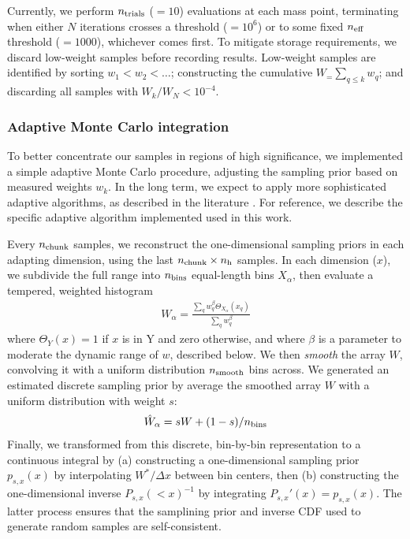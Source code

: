 Currently, we perform $n_{\rm trials}$ ($=10$) evaluations at each mass point, terminating when either $N$ iterations
crosses a threshold ($=10^6$) or to some fixed
$n_{\rm eff}$ threshold ($=1000$), whichever comes first.  
To mitigate storage requirements, we discard  low-weight samples before recording results.  Low-weight samples are identified by sorting  $w_1<w_2<\ldots$;
constructing the cumulative $W_=\sum_{q\le k} w_q$; and discarding all samples with $W_k/W_N<10^{-4}$.  

\subsubsection{Adaptive Monte Carlo integration}

To better concentrate our samples in regions of high significance, we implemented a simple adaptive Monte Carlo procedure, adjusting
the sampling prior based on measured weights $w_k$.   In the long term, we expect to apply more sophisticated adaptive
algorithms, as described in the literature \cite{book-mm-NumericalRecipies,peter1978new}.  For reference, we describe
the specific adaptive algorithm implemented used in this work.


Every $n_{\rm chunk}$ samples, we reconstruct the one-dimensional sampling priors in each adapting dimension, using
the last $n_{\rm chunk}\times n_{\rm h}$ samples.    In each dimension ($x$), we subdivide the full range
into $n_{\rm bins}$ equal-length bins $X_\alpha$, then evaluate a tempered, weighted histogram
\begin{eqnarray}
W_\alpha = \frac{\sum_{q} w_q^\beta \Theta_{X_\alpha}(x_q)}{\sum_q w_q^\beta}
\end{eqnarray}
where $\Theta_Y(x)=1$ if  $x$ is in Y and zero otherwise,  and where $\beta$ is a  parameter to moderate the dynamic
range of $w$, described below.  
%
We then \emph{smooth} the array $W$, convolving it with a uniform distribution $n_{\rm smooth}$ bins across.
%
We generated an estimated discrete sampling prior by average the smoothed array $W$ with a uniform distribution with weight $s$:
\begin{eqnarray}
\hat{W}_\alpha = s W + (1-s)/n_{\rm bins}
\end{eqnarray}
Finally, we transformed from this discrete, bin-by-bin representation to a continuous integral by (a) constructing
a one-dimensional sampling prior $p_{s,x}(x)$  by interpolating $W^*/\Delta x$ between bin centers, then (b) constructing the
one-dimensional inverse $P_{s,x}(<x)^{-1}$ by integrating $P_{s,x}'(x)=p_{s,x}(x)$.  
%
The latter process ensures that the samplining prior and inverse CDF used to generate random samples are
self-consistent.   
%


